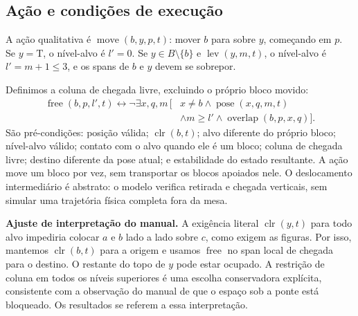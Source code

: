\documentclass[11pt,a4paper]{article}
\newcommand{\lev}{\operatorname{lev}}
\newcommand{\clr}{\operatorname{clr}}
\newcommand{\pose}{\operatorname{pose}}
\newcommand{\free}{\operatorname{free}}
\newcommand{\mv}{\operatorname{move}}
\newcommand{\Ov}{\operatorname{overlap}}
\newcommand{\T}{\mathrm{T}}
\begin{document}
\subsection{Ação e condições de execução}
A ação qualitativa é $\mv(b,y,p,t)$: mover $b$ para sobre $y$, começando em $p$. Se $y=\T$, o nível-alvo é $l'=0$. Se $y\in B\setminus\{b\}$ e $\lev(y,m,t)$, o nível-alvo é $l'=m+1\leq3$, e os spans de $b$ e $y$ devem se sobrepor.

Definimos a coluna de chegada livre, excluindo o próprio bloco movido:
\begin{align}
\free(b,p,l',t)\leftrightarrow\neg\exists x,q,m\,[&x\neq b\land\pose(x,q,m,t)\nonumber\\[-3pt]
 &\land m\geq l'\land\Ov(b,p,x,q)].
\end{align}
São pré-condições: posição válida; $\clr(b,t)$; alvo diferente do próprio bloco; nível-alvo válido; contato com o alvo quando ele é um bloco; coluna de chegada livre; destino diferente da pose atual; e estabilidade do estado resultante. A ação move um bloco por vez, sem transportar os blocos apoiados nele. O deslocamento intermediário é abstrato: o modelo verifica retirada e chegada verticais, sem simular uma trajetória física completa fora da mesa.

\textbf{Ajuste de interpretação do manual.} A exigência literal $\clr(y,t)$ para todo alvo impediria colocar $a$ e $b$ lado a lado sobre $c$, como exigem as figuras. Por isso, mantemos $\clr(b,t)$ para a origem e usamos $\free$ no span local de chegada para o destino. O restante do topo de $y$ pode estar ocupado. A restrição de coluna em todos os níveis superiores é uma escolha conservadora explícita, consistente com a observação do manual de que o espaço sob a ponte está bloqueado. Os resultados se referem a essa interpretação.
\end{document}
